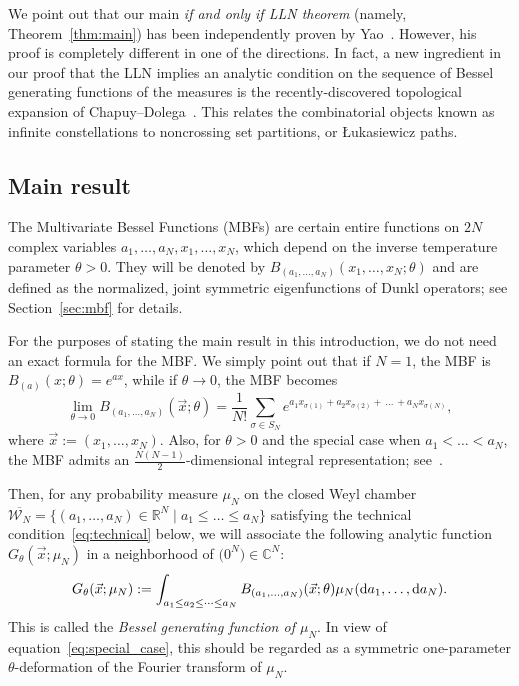 \documentclass[11pt]{article}
\theoremstyle{plain}
\newcommand{\R}{\mathbb R}
\newcommand{\C}{\mathbb C}
\renewcommand{\d}{\textrm d}
\newcommand{\vecx}{\vec{x}}
\begin{document}
We point out that our main \emph{if and only if LLN theorem} (namely, Theorem~\ref{thm:main}) has been independently proven by Yao~\cite{Y}.
However, his proof is completely different in one of the directions.
In fact, a new ingredient in our proof that the LLN implies an analytic condition on the sequence of Bessel generating functions of the measures is the recently-discovered topological expansion of Chapuy--Dolega~\cite{CD}.
This relates the combinatorial objects known as infinite constellations to noncrossing set partitions, or Łukasiewicz paths.



\subsection{Main result}


The Multivariate Bessel Functions (MBFs) are certain entire functions on $2N$ complex variables $a_1,\dots,a_N,x_1,\dots,x_N$, which depend on the inverse temperature parameter $\theta>0$.
They will be denoted by $B_{(a_1,\dots,a_N)}(x_1,\dots,x_N;\theta)$ and are defined as the normalized, joint symmetric eigenfunctions of Dunkl operators; see Section~\ref{sec:mbf} for details.

For the purposes of stating the main result in this introduction, we do not need an exact formula for the MBF.
We simply point out that if $N=1$, the MBF is $B_{(a)}(x;\theta)=e^{ax}$, while if $\theta\to 0$, the MBF becomes
\begin{equation}\label{eq:special_case}
\lim_{\theta\to 0}{B_{(a_1,\dots,a_N)}(\vecx;\theta)} = \frac{1}{N!}\sum_{\sigma\in S_N}{ e^{a_1x_{\sigma(1)} + a_2x_{\sigma(2)} + \,\dots\, + a_Nx_{\sigma(N)}} },
\end{equation}
where $\vecx:=(x_1,\dots,x_N)$. Also, for $\theta>0$ and the special case when $a_1<\dots<a_N$, the MBF admits an $\frac{N(N-1)}{2}$-dimensional integral representation; see~\cite[Prop.~3.3]{Cue}.

Then, for any probability measure $\mu_N$ on the closed Weyl chamber $\overline{\mathcal{W}_N} = \{ (a_1,\dots,a_N)\in\R^N \mid a_1\le \dots\le a_N \}$ satisfying the technical condition~\eqref{eq:technical} below, we will associate the following analytic function $G_\theta(\vecx;\mu_N)$ in a neighborhood of $\big(0^N\big)\in\C^N$:
    \[
    G_\theta(\vecx;\mu_N) := \int_{ a_1\le  a_2\le\dots\le a_N} B_{( a_1,\dots, a_N)}(\vecx;\theta)\mu_N(\d a_1,\dots,\d a_N).
    \]
This is called the \emph{Bessel generating function of $\mu_N$}.
In view of equation~\eqref{eq:special_case}, this should be regarded as a symmetric one-parameter $\theta$-deformation of the Fourier transform of $\mu_N$.
\end{document}
